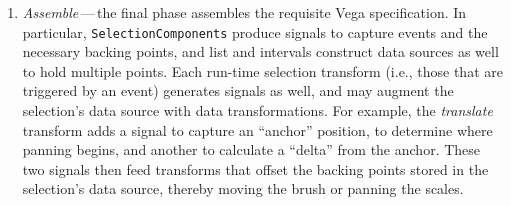 \begin{enumerate}
  \item \emph{Assemble}\,---\,the final phase assembles the requisite Vega
  specification. In particular, \texttt{SelectionComponents} produce signals to
  capture events and the necessary backing points, and list and intervals
  construct data sources as well to hold multiple points. Each run-time
  selection transform (i.e., those that are triggered by an event) generates
  signals as well, and may augment the selection's data source with data
  transformations. For example, the \emph{translate} transform adds a signal to
  capture an ``anchor'' position, to determine where panning begins, and another
  to calculate a ``delta'' from the anchor. These two signals then feed
  transforms that offset the backing points stored in the selection's data
  source, thereby moving the brush or panning the scales.
\end{enumerate}

